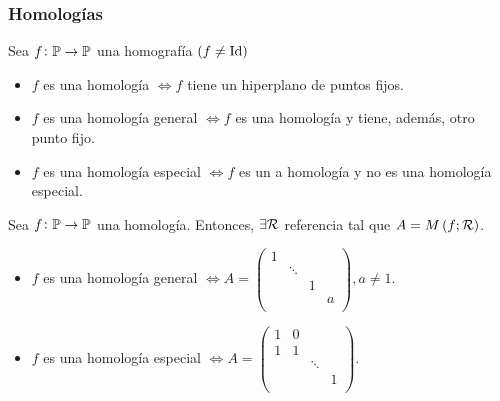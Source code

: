 \subsubsection{Homologías}

\begin{defi}
    Sea $f \colon \mathbb{P} \to \mathbb{P}$ una homografía $\left( f \neq \operatorname{Id} \right)$
    \begin{itemize}
        \item $f$ es una homología $\iff f$ tiene un hiperplano de puntos fijos.
        \item $f$ es una homología general $\iff f$ es una homología y tiene, además, otro punto fijo.
        \item $f$ es una homología especial $\iff f$ es un a homología y no es una homología especial.
    \end{itemize}
\end{defi}

\begin{prop}
    Sea $f \colon \mathbb{P} \to \mathbb{P}$ una homología. Entonces, $\exists \mathcal{R}$ referencia tal que $A=M\left( f ; \mathcal{R} \right)$.
    \begin{itemize}
        \item $f$ es una homología general $ \iff A=
            \begin{pmatrix}
                1 & & & \\
                & \ddots & & \\
                & & 1 & \\
                & & & a \\
            \end{pmatrix}, a \neq 1.$
        \item $f$ es una homología especial $ \iff A=
            \begin{pmatrix}
                1 & 0 & & \\
                1 & 1 & & \\
                & & \ddots &  \\
                & & & 1 \\
            \end{pmatrix}.$
    \end{itemize}
\end{prop}

